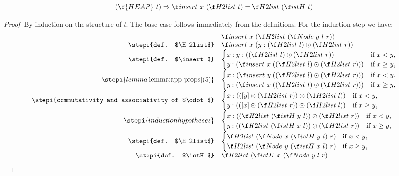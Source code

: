 \documentclass[a4paper,11pt]{llncs}
\begin{document}
\begin{proposition}
\label{prop:h2ist}
  \[ (\f{HEAP}\ t) \Rightarrow \insert\ x\ (\H2list\ t) = \H2list\
  (\istH\ t) \]
\end{proposition}
\begin{proof}
  By induction on the structure of $t$. The base case follows
  immediately from the definitions. For the induction step we have:
\[
  \begin{array}{rl}
    & \insert\ x\ (\H2list\ (\Node\ y\ l\ r)) \\
    \stepi{def. $\H2list$}
    & \insert\ x\ (y:(\H2list\ l) \odot (\H2list\ r)) \\
    \stepi{def. $\insert$}
    & 
    \begin{cases}
      x:y:((\H2list\ l)\odot(\H2list\ r))
      & \text{if $x<y$,}\\
      y:(\insert\ x\ ((\H2list\ l)\odot(\H2list\ r)))
      & \text{if $x\geq y$,}\\
    \end{cases} \\
    \stepi{lemma \ref{lemma:app-props} (5)}
    & 
    \begin{cases}
      x:(\insert\ y\ ((\H2list\ l)\odot(\H2list\ r)))
      & \text{if $x<y$,}\\
      y:(\insert\ x\ ((\H2list\ l)\odot(\H2list\ r)))
      & \text{if $x\geq y$,}\\
    \end{cases} \\
    \stepi{commutativity and associativity of $\odot$}
    & 
    \begin{cases}
      x:(([y]\odot(\H2list\ r))\odot(\H2list\ l))
      & \text{if $x<y$,}\\
      y:(([x]\odot(\H2list\ r))\odot(\H2list\ l))
      & \text{if $x\geq y$,}\\
    \end{cases} \\
    \stepi{induction hypotheses}
    & 
    \begin{cases}
      x:((\H2list\ (\istH\ y\ l))\odot(\H2list\ r))
      & \text{if $x<y$,}\\
      y:((\H2list\ (\istH\ x\ l))\odot(\H2list\ r))
      & \text{if $x\geq y$,}\\
    \end{cases} \\
    \stepi{def. $\H2list$}
    &
    \begin{cases}
      \H2list\ (\Node\ x\ (\istH\ y\ l)\ r)
      & \text{if $x<y$,}\\
      \H2list\ (\Node\ y\ (\istH\ x\ l)\ r)
      & \text{if $x\geq y$,}\\
    \end{cases} \\
    \stepi{def. $\istH$}
    &
    \H2list\ (\istH\ x\ (\Node\ y\ l\ r)
 \end{array}
\]
\end{proof}
\end{document}
